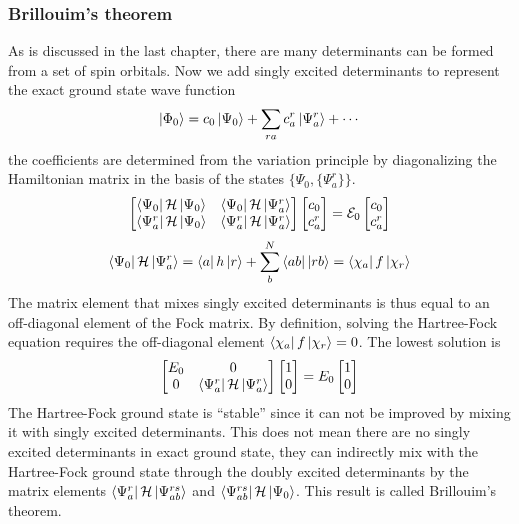 \documentclass[11pt]{article}
\begin{document}
\subsubsection{Brillouim's theorem}
As is discussed in the last chapter, there are many determinants can be formed from a set of spin orbitals. Now we add singly excited
determinants to represent the exact ground state wave function
\begin{equation}
    \ket{\Phi_0}=c_0\ket{\Psi_0}+\sum_{ra}c_a^r\ket{\Psi_a^r}+\cdots
\end{equation}
the coefficients are determined from the variation principle by diagonalizing the Hamiltonian matrix in the basis of the states $\{\Psi_0, \{\Psi_a^r\}\}$.
\begin{equation}
    \begin{bmatrix}
        \bra{\Psi_0}\mathcal{H}\ket{\Psi_0} & \bra{\Psi_0}\mathcal{H}\ket{\Psi_a^r}\\
        \bra{\Psi_a^r}\mathcal{H}\ket{\Psi_0} & \bra{\Psi_a^r}\mathcal{H}\ket{\Psi_a^r}
    \end{bmatrix}
    \begin{bmatrix}
        c_0\\
        c_a^r
    \end{bmatrix}
    =\mathcal{E}_0
    \begin{bmatrix}
        c_0\\
        c_a^r
    \end{bmatrix}
\end{equation}
\begin{equation}
        \bra{\Psi_0}\mathcal{H}\ket{\Psi_a^r}=\bra{a}h\ket{r}+\sum_{b}^{N}\bra{ab}\ket{rb}=\bra{\chi_a}f\ket{\chi_r}
\end{equation}
The matrix element that mixes singly excited determinants is thus equal to an off-diagonal element of the Fock matrix.
By definition, solving the Hartree-Fock equation requires the off-diagonal element $\bra{\chi_a}f\ket{\chi_r}=0$. The
lowest solution is
\begin{equation}
    \begin{bmatrix}
        E_0& 0\\
        0 & \bra{\Psi_a^r}\mathcal{H}\ket{\Psi_a^r}
    \end{bmatrix}
    \begin{bmatrix}
        1\\
        0
    \end{bmatrix}
    =E_0
    \begin{bmatrix}
        1\\
        0
    \end{bmatrix}
\end{equation}
The Hartree-Fock ground state is ``stable'' since it can not be improved by mixing it with singly excited determinants.
This does not mean there are no singly excited determinants in exact ground state, they can indirectly mix with the 
Hartree-Fock ground state through the doubly excited determinants by the matrix elements $\bra{\Psi_a^r}\mathcal{H}\ket{\Psi_{ab}^{rs}}$ and
$\bra{\Psi_{ab}^{rs}}\mathcal{H}\ket{\Psi_0}$. This result is called Brillouim's theorem.
\end{document}
